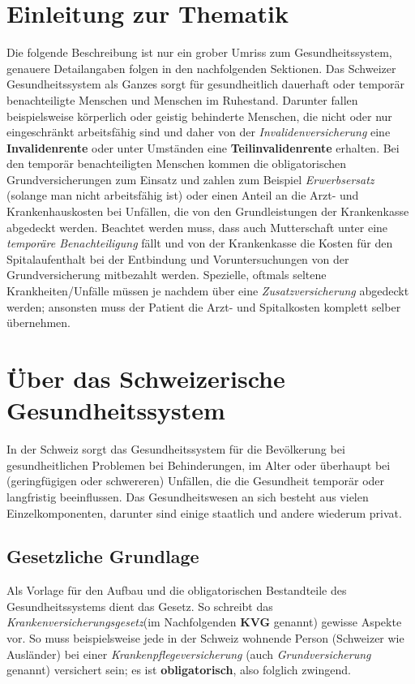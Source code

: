 \documentclass[a4paper,12pt]{book}
\begin{document}
\section{Einleitung zur Thematik}
Die folgende Beschreibung ist nur ein grober Umriss zum Gesundheitssystem, genauere Detailangaben folgen in den nachfolgenden Sektionen.\newline
Das Schweizer Gesundheitssystem als Ganzes sorgt für gesundheitlich dauerhaft oder temporär benachteiligte Menschen und Menschen im Ruhestand. Darunter fallen beispielsweise körperlich oder geistig behinderte Menschen, die nicht oder nur eingeschränkt arbeitsfähig sind und daher von der \emph{Invalidenversicherung} eine \textbf{Invalidenrente} oder unter Umständen eine \textbf{Teilinvalidenrente} erhalten. Bei den temporär benachteiligten Menschen kommen die obligatorischen Grundversicherungen zum Einsatz und zahlen zum  Beispiel \emph{Erwerbsersatz} (solange man nicht arbeitsfähig ist) oder einen Anteil an die Arzt- und Krankenhauskosten bei Unfällen, die von den Grundleistungen der Krankenkasse abgedeckt werden. Beachtet werden muss, dass auch Mutterschaft unter eine \textit{temporäre Benachteiligung} fällt und von der Krankenkasse die Kosten für den Spitalaufenthalt bei der Entbindung und Voruntersuchungen von der Grundversicherung mitbezahlt werden. Spezielle, oftmals seltene Krankheiten/Unfälle müssen je nachdem über eine \emph{Zusatzversicherung} abgedeckt werden; ansonsten muss der Patient die Arzt- und Spitalkosten komplett selber übernehmen.
\newpage
\section{Über das Schweizerische Gesundheitssystem}
In der Schweiz sorgt das Gesundheitssystem für die Bevölkerung bei gesundheitlichen Problemen bei Behinderungen, im Alter oder überhaupt bei (geringfügigen oder schwereren) Unfällen, die die Gesundheit temporär oder langfristig beeinflussen.
Das Gesundheitswesen an sich besteht aus vielen Einzelkomponenten, darunter sind einige staatlich und andere wiederum privat.
\subsection{Gesetzliche Grundlage}
Als Vorlage für den Aufbau und die obligatorischen Bestandteile des Gesundheitssystems dient das Gesetz. So schreibt das \emph{Krankenversicherungsgesetz}(im Nachfolgenden \textbf{KVG} genannt) gewisse Aspekte vor. So muss beispielsweise jede in der Schweiz wohnende Person (Schweizer wie Ausländer) bei einer \emph{Krankenpflegeversicherung} (auch \emph{Grundversicherung} genannt) versichert sein; es ist \textbf{obligatorisch}, also folglich zwingend.
\end{document}
